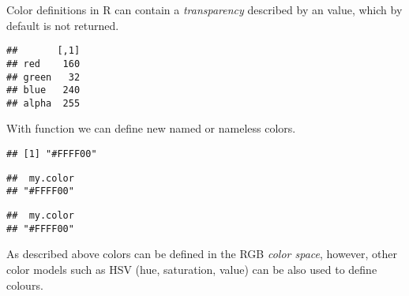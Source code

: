 \documentclass[krantz2]{krantz}\usepackage{knitr}%
\begin{document}
Color definitions in R can contain a \emph{transparency} described by an  value, which by default is not returned.

\begin{knitrout}\footnotesize
{}\color{fgcolor}\begin{kframe}
\begin{alltt}
\hlstd{(}\hlstd{,}  \hlstd{=} \hlstd{)}
\end{alltt}
\begin{verbatim}
##       [,1]
## red    160
## green   32
## blue   240
## alpha  255
\end{verbatim}
\end{kframe}
\end{knitrout}

With function  we can define new named or nameless colors.
\begin{knitrout}\footnotesize
{}\color{fgcolor}\begin{kframe}
\begin{alltt}
\hlstd{(}\hlstd{,} \hlstd{,} \hlstd{)}
\end{alltt}
\begin{verbatim}
## [1] "#FFFF00"
\end{verbatim}
\begin{alltt}
\hlstd{(}\hlstd{,} \hlstd{,} \hlstd{,}  \hlstd{=} \hlstd{)}
\end{alltt}
\begin{verbatim}
##  my.color 
## "#FFFF00"
\end{verbatim}
\begin{alltt}
\hlstd{(}\hlstd{,} \hlstd{,} \hlstd{,}  \hlstd{=} \hlstd{,}  \hlstd{=} \hlstd{)}
\end{alltt}
\begin{verbatim}
##  my.color 
## "#FFFF00"
\end{verbatim}
\end{kframe}
\end{knitrout}

As described above colors can be defined in the RGB \emph{color space}, however, other color models such as HSV (hue, saturation, value) can be also used to define colours.
\end{document}

